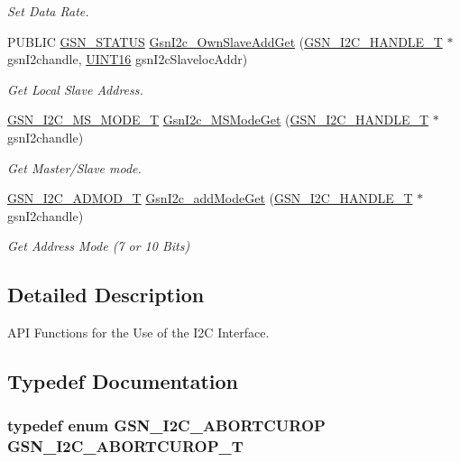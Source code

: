 \begin{DoxyCompactItemize}
\begin{DoxyCompactList}\small\item\em Set Data Rate. \end{DoxyCompactList}\item 
PUBLIC \hyperlink{a00660_gada5951904ac6110b1fa95e51a9ddc217}{GSN\_\-STATUS} \hyperlink{a00649_ga2a1f35ecff4dd0518db43da269962818}{GsnI2c\_\-OwnSlaveAddGet} (\hyperlink{a00100}{GSN\_\-I2C\_\-HANDLE\_\-T} $\ast$gsnI2chandle, \hyperlink{a00660_ga09f1a1fb2293e33483cc8d44aefb1eb1}{UINT16} gsnI2cSlavelocAddr)
\begin{DoxyCompactList}\small\item\em Get Local Slave Address. \end{DoxyCompactList}\item 
\hyperlink{a00649_ga72605883ea904f4ee6c310a25142a0ab}{GSN\_\-I2C\_\-MS\_\-MODE\_\-T} \hyperlink{a00649_gabcb5149cfa26cd66ce55cfad5c8d9a56}{GsnI2c\_\-MSModeGet} (\hyperlink{a00100}{GSN\_\-I2C\_\-HANDLE\_\-T} $\ast$gsnI2chandle)
\begin{DoxyCompactList}\small\item\em Get Master/Slave mode. \end{DoxyCompactList}\item 
\hyperlink{a00649_gac3021fdaf2e11a7972d53d5292ad5f26}{GSN\_\-I2C\_\-ADMOD\_\-T} \hyperlink{a00649_gaee7528d38130deb5c253f3b1efc46fba}{GsnI2c\_\-addModeGet} (\hyperlink{a00100}{GSN\_\-I2C\_\-HANDLE\_\-T} $\ast$gsnI2chandle)
\begin{DoxyCompactList}\small\item\em Get Address Mode (7 or 10 Bits) \end{DoxyCompactList}\end{DoxyCompactItemize}


\subsection{Detailed Description}
API Functions for the Use of the I2C Interface. 

\subsection{Typedef Documentation}
\hypertarget{a00649_gaee6d5c48317a97a0237257dac66b7f8f}{
\subsubsection[{GSN\_\-I2C\_\-ABORTCUROP\_\-T}]{\setlength{\rightskip}{0pt plus 5cm}typedef enum {\bf GSN\_\-I2C\_\-ABORTCUROP}  {\bf GSN\_\-I2C\_\-ABORTCUROP\_\-T}}}
\label{a00649_gaee6d5c48317a97a0237257dac66b7f8f}


